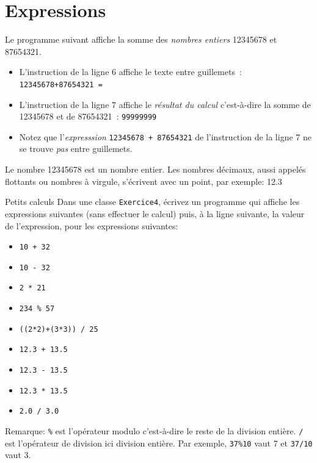 \documentclass[a4paper,11pt]{style-esi/td}
\begin{document}
\section{Expressions}

Le programme suivant affiche la somme des \emph{nombres entiers}  12345678 et 87654321.


\begin{itemize}
	\item	L'instruction de la ligne 6 affiche le texte entre guillemets~: \texttt{12345678+87654321 = }

	\item L'instruction de la ligne 7 affiche le \emph{résultat du calcul}
	      c'est-à-dire la somme de 12345678 et de 87654321~:  \texttt{99999999}

	\item Notez que l'\emph{expresssion} \texttt{12345678 + 87654321}
	      de l'instruction de la ligne 7 ne se trouve \emph{pas} entre guillemets.
\end{itemize}

Le nombre 12345678 est un nombre entier. Les nombres décimaux, aussi appelés flottants ou nombres à virgule, s'écrivent avec un point, par exemple: 12.3

\newpage

\begin{Exercice}{Petits calculs}
	Dans une classe \texttt{Exercice4}, écrivez un programme qui affiche les expressions suivantes (sans effectuer le calcul) puis, à la ligne suivante,
	la valeur de l'expression, pour les expressions	suivantes:
	\begin{itemize}
		\item \texttt{10 + 32}
		\item \texttt{10 - 32}
		\item \texttt{2 * 21}
		\item \texttt{234 \% 57}
		\item \texttt{((2*2)+(3*3)) / 25}
		\item \texttt{12.3 + 13.5}
		\item \texttt{12.3 - 13.5}
		\item \texttt{12.3 * 13.5}
		\item \texttt{2.0 / 3.0}
	\end{itemize}

	Remarque: \texttt{\%} est l'opérateur modulo c'est-à-dire le reste de la division entière.
	\texttt{/} est l'opérateur de division ici division entière. Par exemple,
	\texttt{37\%10} vaut 7 et \texttt{37/10} vaut 3.

\end{Exercice}
\end{document}
